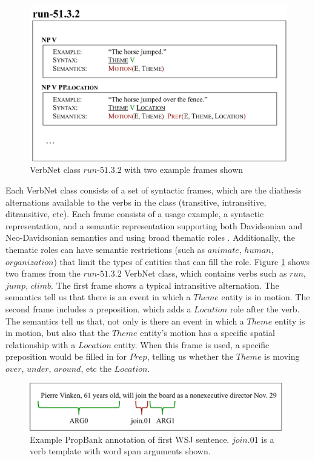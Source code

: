 \documentclass[11pt,a4paper]{article}
\begin{document}
\begin{figure}[h]
\begin{centering}
    \includegraphics[width= \linewidth ]{resources/ch5_resources/verbnet_frame.pdf}
    \caption{VerbNet class $run\text{-}51.3.2$ with two example frames shown}
    \label{fig:verbnet}
\end{centering}
\end{figure}

Each VerbNet class consists of a set of syntactic frames, which are the
diathesis alternations available to the verbs in the class (transitive,
intransitive, ditransitive, etc). Each frame consists of a usage example, a
syntactic representation, and a semantic representation supporting both Davidsonian and Neo-Davidsonian semantics and
using broad thematic roles \cite{verbnet}. Additionally, the thematic roles can
have semantic restrictions (such as $animate$, $human$, $organization$) that
limit the types of entities that can fill the role. Figure \ref{fig:verbnet}
shows two frames from the $run\text{-}51.3.2$ VerbNet class, which contains
verbs such as $run$, $jump$, $climb$. The first frame shows a typical intransitive
alternation. The semantics tell us that there is an event in which a $Theme$
entity is in motion. The second frame includes a preposition, which adds
a $Location$ role after the verb. The semantics tell us that, not only is there 
an event in which a $Theme$ entity is in motion, but also that the $Theme$ entity's
motion has a specific spatial relationship with a $Location$ entity. 
When this frame is used, a specific preposition would be filled in for $Prep$, 
telling us whether the $Theme$ is moving $over$, $under$, $around$, etc the 
$Location$.

\begin{figure}[h]
\begin{centering}
    \includegraphics[width=1.0 \linewidth ]{resources/ch5_resources/propbank.pdf}
    \caption{Example PropBank annotation of first WSJ sentence. $join.01$ is a verb template with word span arguments shown.}
    \label{fig:propbank}
\end{centering}
\end{figure}
\end{document}
